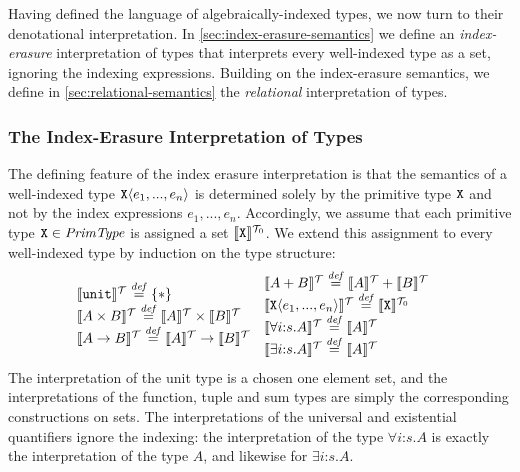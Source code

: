 Having defined the language of algebraically-indexed types, we now
turn to their denotational interpretation. In
\autoref{sec:index-erasure-semantics} we define an
\emph{index-erasure} interpretation of types that interprets every
well-indexed type as a set, ignoring the indexing expressions. Building on
the index-erasure semantics, we define in
\autoref{sec:relational-semantics} the \emph{relational}
interpretation of types.


\subsubsection{The Index-Erasure Interpretation of Types}
\label{sec:index-erasure-semantics}

The defining feature of the index erasure interpretation is that the
semantics of a well-indexed type $\texttt{X}\langle e_1,...,e_n \rangle$ is
determined solely by the primitive type $\texttt{X}$ and not by the
index expressions $e_1,...,e_n$. Accordingly, we assume that each
primitive type $\texttt{X} \in \mathit{PrimType}$ is assigned a set
$\llbracket \texttt{X} \rrbracket^{\mathcal{T}_0}$. We extend this assignment to every
well-indexed type by induction on the type structure:
\begin{displaymath}
  \begin{array}{@{\hspace{0em}}c@{\hspace{0em}}c}
    \begin{array}{@{}l}
      \tySem{\tyUnit} \isDefinedAs \{*\} \\
      \tySem{A \tyProduct B} \isDefinedAs \tySem{A} \times \tySem{B} \\
      \tySem{A \tyArr B} \isDefinedAs \tySem{A} \to \tySem{B} \\
    \end{array}
    &
    \begin{array}{l}
      \tySem{A + B} \isDefinedAs \tySem{A} + \tySem{B} \\
      \tySem{\tyPrim{X}{e_1,...,e_n}} \isDefinedAs \tyPrimSem{\tyPrimNm{X}} \\
      \tySem{\forall i\mathord:s. A} \isDefinedAs \tySem{A} \\
      \tySem{\exists i\mathord:s. A} \isDefinedAs \tySem{A}
    \end{array}
  \end{array}
\end{displaymath}
The interpretation of the unit type is a chosen one element set, and
the interpretations of the function, tuple and sum types are simply
the corresponding constructions on sets. The interpretations of the
universal and existential quantifiers ignore the indexing: the
interpretation of the type $\forall i\mathord:s.A$ is exactly the
interpretation of the type $A$, and likewise for $\exists
i\mathord:s.A$.

